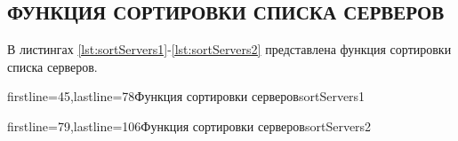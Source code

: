 \begin{appendices}
    \chapter{ФУНКЦИЯ СОРТИРОВКИ СПИСКА СЕРВЕРОВ}
    В листингах \ref{lst:sortServers1}-\ref{lst:sortServers2} представлена функция сортировки списка серверов.

        {firstline=45,lastline=78}{Функция сортировки серверов}{sortServers1}{}

        {firstline=79,lastline=106}{Функция сортировки серверов}{sortServers2}{}
\end{appendices}
